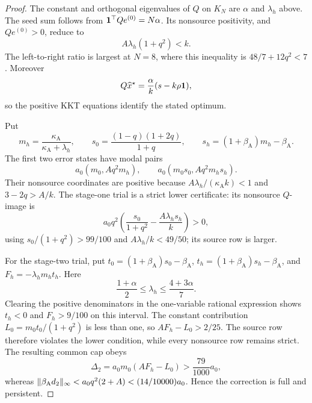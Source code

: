 \begin{proof}
The constant and orthogonal eigenvalues of $Q$ on $K_N$ are $\alpha$ and
$\lambda_h$ above.  The seed sum follows from
$\mathbf{1}^\top Qe^{(0)}=N\alpha$.  Its nonsource positivity, and
$Qe^{(0)}>0$, reduce to
\begin{equation*}
 A\lambda_h(1+q^2)<k.
\end{equation*}
The left-to-right ratio is largest at $N=8$, where this inequality is
$48/7+12q^2<7$.  Moreover
\begin{equation*}
 Q\widehat x^\star
 =\frac\alpha k(s-k\rho\mathbf{1}),
\end{equation*}
so the positive KKT equations identify the stated optimum.

Put
\begin{equation*}
 m_h=\frac{\kappa_{\mathrm A}}{\kappa_{\mathrm A}+\lambda_h},\qquad
 s_0=\frac{(1-q)(1+2q)}{1+q},\qquad
 s_h=(1+\beta_{\mathrm A})m_h-\beta_{\mathrm A}.
\end{equation*}
The first two error states have modal pairs
\begin{equation*}
 a_0(m_0,Aq^2m_h),\qquad
 a_0(m_0s_0,Aq^2m_hs_h).
\end{equation*}
Their nonsource coordinates are positive because
$A\lambda_h/(\kappa_{\mathrm A}k)<1$ and
$3-2q>A/k$.  The stage-one trial is a strict lower certificate: its
nonsource $Q$-image is
\begin{equation*}
 a_0q^2\left(\frac{s_0}{1+q^2}
                 -\frac{A\lambda_hs_h}{k}\right)>0,
\end{equation*}
using $s_0/(1+q^2)>99/100$ and
$A\lambda_h/k<49/50$; its source row is larger.

For the stage-two trial, put
$t_0=(1+\beta_{\mathrm A})s_0-\beta_{\mathrm A}$,
$t_h=(1+\beta_{\mathrm A})s_h-\beta_{\mathrm A}$, and
$F_h=-\lambda_hm_ht_h$.  Here
\begin{equation*}
 \frac{1+\alpha}{2}\leq\lambda_h
 \leq\frac{4+3\alpha}{7}.
\end{equation*}
Clearing the positive denominators in the one-variable rational expression
shows $t_h<0$ and $F_h>9/100$ on this interval.  The constant contribution
$L_0=m_0t_0/(1+q^2)$ is less than one, so
$AF_h-L_0>2/25$.  The source row therefore violates the lower condition,
while every nonsource row remains strict.  The resulting common cap obeys
\begin{equation*}
 \Delta_2=a_0m_0(AF_h-L_0)>\frac{79}{1000}a_0,
\end{equation*}
whereas
$\lVert\beta_{\mathrm A}d_2\rVert_\infty
 <a_0q^2(2+A)<(14/10000)a_0$.  Hence the correction is full and persistent.


\end{proof}
